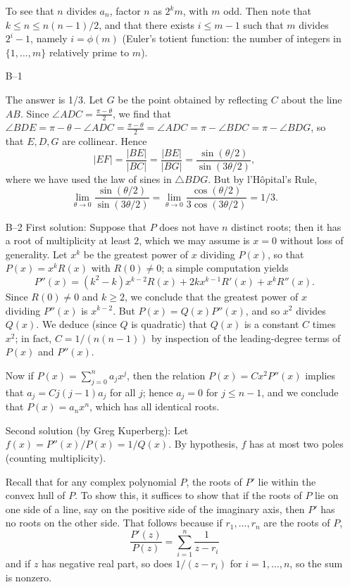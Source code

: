 \documentclass[amssymb,twocolumn,pra,10pt,aps]{revtex4-1}
\begin{document}
\begin{itemize}
To see that $n$ divides $a_n$, factor $n$ as $2^k m$, with $m$
odd. Then note that $k \leq n \leq n(n-1)/2$, and that there
exists $i \leq m-1$ such that $m$ divides $2^i-1$, namely $i =
\phi(m)$ (Euler's totient function: the number of integers in
$\{1, \dots, m\}$ relatively prime to $m$).

\item[B--1]

The answer is 1/3.
Let $G$ be the point obtained by reflecting $C$ about the line $AB$.
Since $\angle ADC = \frac{\pi-\theta}{2}$, we find that
$\angle BDE = \pi - \theta - \angle ADC = \frac{\pi-\theta}{2}
= \angle ADC = \pi - \angle BDC = \pi - \angle BDG$, so that $E,D,G$
are collinear.  Hence
\[
|EF| = \frac{|BE|}{|BC|} = \frac{|BE|}{|BG|} = \frac{\sin
(\theta/2)}{\sin (3\theta/2)},
\]
where we have used the law of sines in $\triangle BDG$.  But by
l'H\^opital's Rule,
\[
\lim_{\theta \rightarrow 0}
\frac{\sin(\theta/2)}{\sin(3\theta/2)} =
\lim_{\theta \rightarrow 0}
\frac{\cos(\theta/2)}{3\cos(3\theta/2)} = 1/3.
\]

\item[B--2]
First solution:
Suppose that $P$ does not have $n$ distinct roots; then it has
a root of multiplicity at least $2$, which we may assume is $x=0$
without loss of generality.  Let $x^k$ be the greatest power of $x$
dividing $P(x)$, so that $P(x) = x^k R(x)$ with $R(0) \neq 0$;
a simple computation yields
\[
P''(x) = (k^2-k)x^{k-2} R(x) + 2kx^{k-1} R'(x) + x^k R''(x).
\]
Since $R(0) \neq 0$ and $k\geq 2$, we conclude that the greatest power of $x$
dividing $P''(x)$ is $x^{k-2}$.  But $P(x) = Q(x) P''(x)$, and so
$x^2$ divides $Q(x)$.
We deduce (since $Q$ is quadratic)
that $Q(x)$ is a constant $C$ times $x^2$; in fact, $C=1/(n(n-1))$ by
inspection of the leading-degree terms of $P(x)$ and $P''(x)$.

Now if $P(x) = \sum_{j=0}^n a_j x^j$, then the relation
$P(x) = Cx^2 P''(x)$ implies that $a_j = Cj(j-1)a_j$ for all $j$;
hence $a_j = 0$ for $j \leq n-1$, and we conclude that $P(x) = a_n x^n$,
which has all identical roots.

Second solution (by Greg Kuperberg): Let $f(x) = P''(x)/P(x) = 1/Q(x)$. By
hypothesis, $f$ has at most two poles (counting multiplicity).

Recall that for any complex polynomial $P$, the roots of $P'$ lie within the convex
hull of $P$. To show this, it suffices to show that if the roots of $P$ lie on one
side of a line, say on the positive side of the imaginary axis, then $P'$ has no
roots on the other side. That follows because if $r_1, \dots, r_n$ are the roots of $P$,
\[
\frac{P'(z)}{P(z)} = \sum_{i=1}^n \frac{1}{z-r_i}
\]
and if $z$ has negative real part, so does $1/(z-r_i)$ for $i=1, \dots, n$,
so the sum is nonzero.


\end{itemize}
\end{document}
